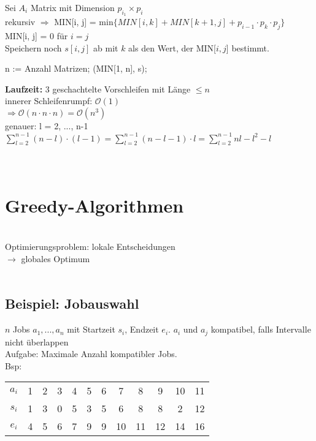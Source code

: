 Sei $A_i$ Matrix mit Dimension $p_{i_1} \times p_i$\\
rekursiv $\Rightarrow$ MIN[i, j] = min$\lbrace MIN[i, k] + MIN[k+1, j] + p_{i-1} \cdot p_k \cdot p_j\rbrace$\\
MIN[i, j] = 0 für $i = j$\\
Speichern noch $s[i, j]$ ab mit $k$ als den Wert, der MIN[$i, j$] bestimmt.\\
\begin{algorithmic}
\State n := Anzahl Matrizen;
  
\EndFor
{}  
\EndFor
\Return (MIN[1, n], s);
\end{algorithmic}
\textbf{Laufzeit:} 3 geschachtelte Vorschleifen mit Länge $\leq n$\\
innerer Schleifenrumpf: $\mathcal O(1)$\\
$\Rightarrow \mathcal O(n \cdot n \cdot n) = \mathcal O(n^3)$\\
genauer: l = 2, ..., n-1\\
$\sum\nolimits_{l = 2}^{n-1}(n - l)\cdot(l-1) = \sum\nolimits_{l = 2}^{n-1}(n-l-1) \cdot l = \sum\nolimits_{l = 2}^{n-1} nl - l^2 - l$
\ \\
\ \\
\ \\
\section{Greedy-Algorithmen}
\ \\
Optimierungsproblem: lokale Entscheidungen\\
$\rightarrow$ globales Optimum\\
\ \\

\subsection{Beispiel: Jobauswahl}
$n$ Jobs $a_1, ..., a_n$ mit Startzeit $s_i$, Endzeit $e_i$. $a_i$ und $a_j$ kompatibel, falls Intervalle nicht überlappen\\
Aufgabe: Maximale Anzahl kompatibler Jobs.\\
Bsp:\\
\begin{tabular}{c c c c c c c c c c c c}
$a_i$ & 1 & 2 & 3 & 4 & 5 & 6 & 7 & 8 & 9 & 10 & 11\\
$s_i$ & 1 & 3 & 0 & 5 & 3 & 5 & 6 & 8 & 8 & 2 & 12\\
$e_i$ & 4 & 5 & 6 & 7 & 9 & 9 & 10 & 11 & 12 & 14 & 16\\
\end{tabular}

